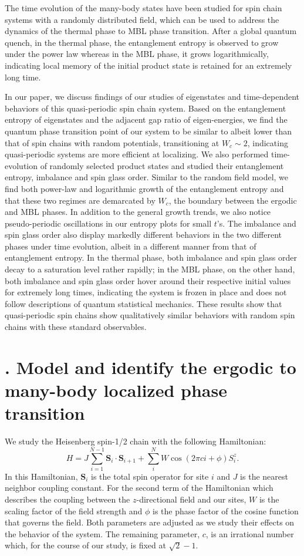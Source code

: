 \documentclass[prl,aps,epsf,showpacs,twocolumn,letterpaper]{revtex4}
\let\oldsection\section
\renewcommand{\section}[1]{\stepcounter{section}\oldsection{\Roman{section}. #1}}
\begin{document}
The time evolution of the many-body states have been studied for spin chain
systems with a randomly distributed field\cite{kjall2014,luitz2016time}, which
can be used to address the dynamics of the thermal phase to MBL phase
transition\cite{nandkishore2015,vosk_theory2014,potter2015}.
After a global quantum quench, in the thermal phase, the entanglement entropy is
observed to grow under the power law whereas in the MBL phase, it grows
logarithmically, indicating local memory of the initial product state is
retained for an extremely long time.


In our paper, we discuss findings of our studies of eigenstates and
time-dependent behaviors of this quasi-periodic spin chain system.
Based on the entanglement entropy of eigenstates and the adjacent gap ratio of
eigen-energies, we find the quantum phase transition point of our system to be
similar to albeit lower than that of spin chains with random potentials,
transitioning at $W_c \sim 2$, indicating quasi-periodic systems are more
efficient at localizing.
We also performed time-evolution of randomly selected product states and studied
their entanglement entropy, imbalance and spin glass order.
Similar to the random field model, we find both power-law and logarithmic growth
of the entanglement entropy and that these two regimes are demarcated by
$W_c$, the boundary between the ergodic and MBL phases.
In addition to the general growth trends, we also notice pseudo-periodic
oscillations in our entropy plots for small $t$'s.
The imbalance and spin glass order also display markedly different behaviors in
the two different phases under time evolution, albeit in a different manner from
that of entanglement entropy.
In the thermal phase, both imbalance and spin glass order decay to a saturation
level rather rapidly; in the MBL phase, on the other hand, both imbalance and
spin glass order hover around their respective initial values for extremely long
times, indicating the system is frozen in place and does not follow descriptions
of quantum statistical mechanics.
These results show that quasi-periodic spin chains show qualitatively similar
behaviors with random spin chains with these standard observables.


\section{Model and identify the ergodic to many-body localized phase transition}


We study the Heisenberg spin-1/2 chain with the following Hamiltonian:
\[
  H = J\sum_{i=1}^{N-1} \mathbf{S}_i \cdot \mathbf{S}_{i+1}
  + \sum_{i}^{N} W\cos(2\pi c i+\phi) S_i^z \text{.}
\]
In this Hamiltonian, $\mathbf{S}_i$ is the total spin operator for site $i$ and
$J$ is the nearest neighbor coupling constant.
For the second term of the Hamiltonian which describes the coupling between the
$z$-directional field and our sites, $W$ is the scaling factor of the field
strength and $\phi$ is the phase factor of the cosine function that governs the
field.
Both parameters are adjusted as we study their effects on the behavior of the
system.
The remaining parameter, $c$, is an irrational number which, for the course of
our study, is fixed at $\sqrt{2} - 1$.
\end{document}
